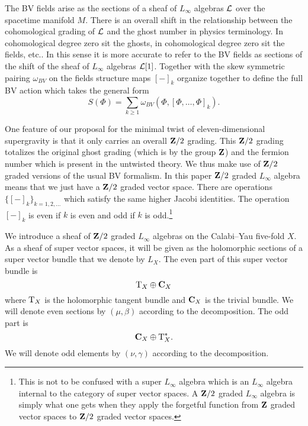 The BV fields arise as the sections of a sheaf of $L_\infty$ algebras $\mathcal L$ over the spacetime manifold $M$.
There is an overall shift in the relationship between the cohomological grading of $\mathcal L$ and the ghost number in physics terminology. 
In cohomological degree zero sit the ghosts, in cohomological degree zero sit the fields, etc..
In this sense it is more accurate to refer to the BV fields as sections of the shift of the sheaf of $L_\infty$ algebras $\mathcal L[1]$. 
Together with the skew symmetric pairing $\omega_{BV}$ on the fields structure maps $[-]_k$ organize together to define the full BV action which takes the general form
\[
S(\Phi) = \sum_{k \geq 1} \omega_{BV} \left(\Phi , [\Phi,\ldots,\Phi]_{k}\right) .
\]

One feature of our proposal for the minimal twist of eleven-dimensional supergravity is that it only carries an overall $\mathbf{Z}/2$ grading. 
This $\mathbf{Z}/2$ grading totalizes the original ghost grading (which is by the group $\mathbf{Z}$) and the fermion number which is present in the untwisted theory.
We thus make use of $\mathbf{Z}/2$ graded versions of the usual BV formalism.
In this paper $\mathbf{Z}/2$ graded $L_\infty$ algebra means that we just have a $\mathbf{Z}/2$ graded vector space.
There are operations $\{[-]_k\}_{k = 1,2,\ldots}$ which satisfy the same higher Jacobi identities.
The operation $[-]_k$ is even if $k$ is even and odd if $k$ is odd.\footnote{This is not to be confused with a super $L_\infty$ algebra which is an $L_\infty$ algebra internal to the category of super vector spaces.
A $\mathbf{Z}/2$ graded $L_\infty$ algebra is simply what one gets when they apply the forgetful function from $\mathbf{Z}$ graded vector spaces to $\mathbf{Z}/2$ graded vector spaces.}

We introduce a sheaf of $\mathbf{Z}/2$ graded $L_\infty$ algebras on the Calabi--Yau five-fold $X$.
As a sheaf of super vector spaces, it will be given as the holomorphic sections of a super vector bundle that we denote by $L_X$. 
The even part of this super vector bundle is
\[
{\rm T}_X \oplus \mathbf{C}_X 
\]
where ${\rm T}_X$ is the holomorphic tangent bundle and $\mathbf{C}_X$ is the trivial bundle.
We will denote even sections by $(\mu, \beta)$ according to the decomposition. 
The odd part is 
\[
\mathbf{C}_X \oplus {\rm T}^*_X .
\]
We will denote odd elements by $(\nu, \gamma)$ according to the decomposition. 

